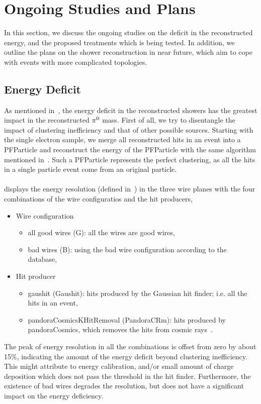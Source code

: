 \section{Ongoing Studies and Plans}
\label{sec:ongoing}

In this section, we discuss the ongoing studies on the deficit in
the reconstructed energy, and the proposed treatments which is being
tested.
In addition, we outline the plans on the shower reconstruction in
near future, which aim to cope with events with more complicated
topologies.

\subsection{Energy Deficit}
\label{sec:energy_deficit}

As mentioned in~, the energy deficit in the reconstructed
showers has the greatest impact in the reconstructed ${\pi}^0$ mass.
First of all, we try to disentangle the impact of clustering inefficiency
and that of other possible sources.
Starting with the single electron sample,
we merge all reconstructed hits in an event into a PFParticle
and reconstruct the energy of the PFParticle with the same algorithm
mentioned in~.
Such a PFParticle represents the perfect clustering, as all the hits
in a single particle event come from an original particle.\\
\\
 displays the energy resolution (defined 
in~)
in the three wire planes with the four combinations of the wire configuratios 
and the hit producers,
\begin{itemize}
\item Wire configuration
  \begin{itemize}
  \item all good wires (G): all the wires are good wires,
  \item bad wires (B): using the bad wire configuration according to
        the database,
  \end{itemize}
\item Hit producer
  \begin{itemize}
  \item gaushit (Gaushit): hits produced by the Gaussian hit finder;
        i.e. all the hits in an event,
  \item pandoraCosmicsKHitRemoval (PandoraCRm): hits produced by
        pandoraCosmics, which removes the hits from cosmic rays~\cite{DocDB5828}.
  \end{itemize}
\end{itemize}
The peak of energy resolution in all the combinations is offset
from zero by about 15\%, indicating the amount of the energy deficit
beyond clustering inefficiency.
This might attribute to energy calibration, and/or small amount of 
charge deposition which does not pass the threshold in the hit finder.
Furthermore, the existence of bad wires degrades the resolution, but
does not have a significant impact on the energy deficiency.

